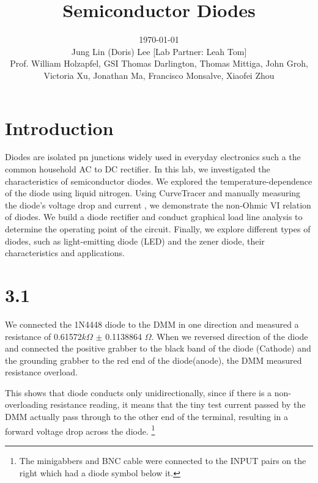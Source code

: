 \documentclass[authoryear, 12pt,5p, times]{elsarticle}
\begin{document}
\begin{frontmatter}
\title{Semiconductor Diodes}
\author{\today \quad \\Jung Lin (Doris) Lee [Lab Partner: Leah Tom]\\Prof. William Holzapfel, GSI Thomas Darlington, Thomas Mittiga, John Groh,  \\Victoria Xu, Jonathan Ma, Francisco Monsalve, Xiaofei Zhou\vspace{-30pt}}	 
\end{frontmatter}
\section*{Introduction\label{intro}}
Diodes are isolated pn junctions widely used in everyday electronics such a the common household AC to DC rectifier.
In this lab, we investigated the characteristics of semiconductor diodes. We explored the temperature-dependence of the diode using liquid nitrogen. Using CurveTracer and manually measuring the diode's voltage drop and current , we demonstrate the non-Ohmic VI relation of diodes. We build a diode rectifier and  conduct graphical load line analysis to determine the operating point of the circuit. Finally, we explore different types of diodes, such as light-emitting diode (LED) and the zener diode, their characteristics and applications. 
\section*{3.1}
We connected the 1N4448 diode to the DMM in one direction and measured a resistance of 0.61572$k\Omega$ $\pm$ 0.1138864 $\Omega$. When we reversed direction of the diode and connected the positive grabber to the black band of the diode (Cathode) and the grounding grabber to the red end of the diode(anode), the DMM measured resistance overload. 
\par This shows that diode conducts only unidirectionally, since if there is a non-overloading resistance reading, it means that the tiny test current passed by the DMM actually pass through to the other end of the terminal, resulting in a forward voltage drop across the diode.
\footnote{The minigabbers and BNC cable were connected to the INPUT pairs on the right which had a diode symbol below it.}
\end{document}
